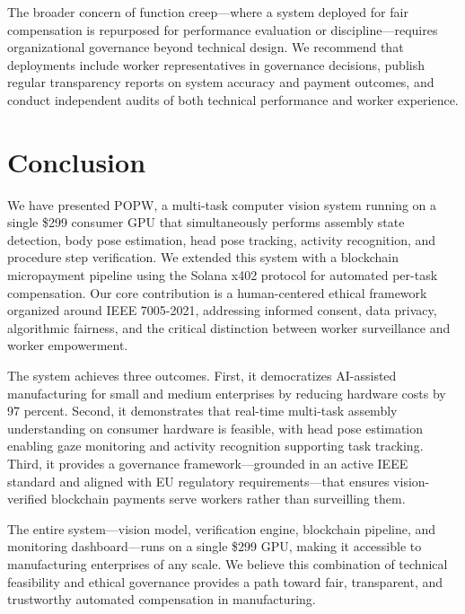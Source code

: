 \documentclass[10pt,twocolumn]{article}
\newcommand{\popw}{POPW}
\begin{document}
The broader concern of function creep---where a system deployed for fair compensation is repurposed for performance evaluation or discipline---requires organizational governance beyond technical design. We recommend that deployments include worker representatives in governance decisions, publish regular transparency reports on system accuracy and payment outcomes, and conduct independent audits of both technical performance and worker experience.

\section{Conclusion}
\label{sec:conclusion}

We have presented \popw, a multi-task computer vision system running on a single \$299 consumer GPU that simultaneously performs assembly state detection, body pose estimation, head pose tracking, activity recognition, and procedure step verification. We extended this system with a blockchain micropayment pipeline using the Solana x402 protocol for automated per-task compensation. Our core contribution is a human-centered ethical framework organized around IEEE 7005-2021, addressing informed consent, data privacy, algorithmic fairness, and the critical distinction between worker surveillance and worker empowerment.

The system achieves three outcomes. First, it democratizes AI-assisted manufacturing for small and medium enterprises by reducing hardware costs by 97 percent. Second, it demonstrates that real-time multi-task assembly understanding on consumer hardware is feasible, with head pose estimation enabling gaze monitoring and activity recognition supporting task tracking. Third, it provides a governance framework---grounded in an active IEEE standard and aligned with EU regulatory requirements---that ensures vision-verified blockchain payments serve workers rather than surveilling them.

The entire system---vision model, verification engine, blockchain pipeline, and monitoring dashboard---runs on a single \$299 GPU, making it accessible to manufacturing enterprises of any scale. We believe this combination of technical feasibility and ethical governance provides a path toward fair, transparent, and trustworthy automated compensation in manufacturing.
\end{document}
